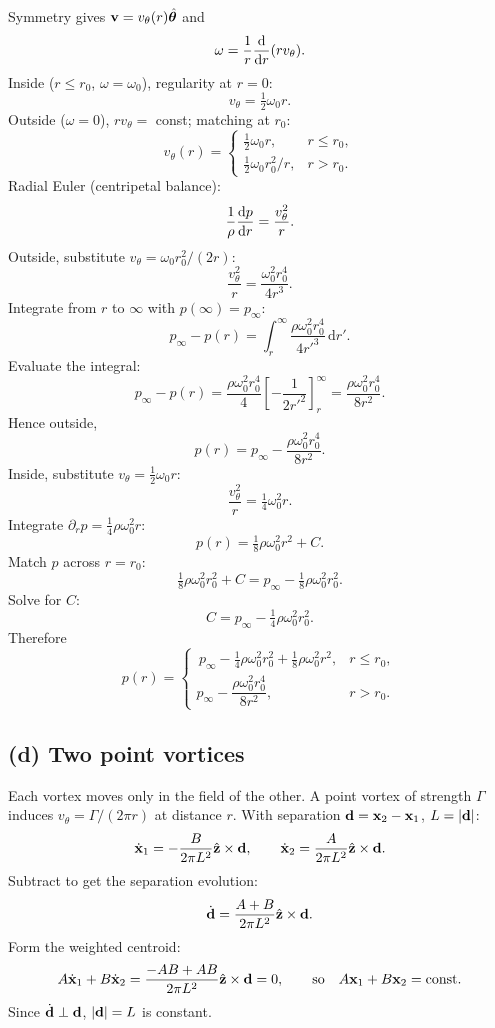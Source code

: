 \documentclass[11pt]{article}
\newcommand{\de}{\mathrm{d}}
\begin{document}
Symmetry gives $\vb v = v_\theta(r)\hat{\bm\theta}$ and
\[ \omega = \frac{1}{r}\dv{r}(rv_\theta). \]
Inside ($r\le r_0$, $\omega=\omega_0$), regularity at $r=0$:
\[ v_\theta = \tfrac12\omega_0 r. \]
Outside ($\omega=0$), $rv_\theta=$ const; matching at $r_0$:
\begin{equation}
\boxed{\;v_\theta(r) = \begin{cases}\tfrac12\omega_0 r, & r\le r_0,\\[2pt] \tfrac12\omega_0 r_0^2/r, & r>r_0.\end{cases}\;}
\label{eq:v-rankine}
\end{equation}
Radial Euler (centripetal balance):
\[ \frac{1}{\rho}\dv{p}{r} = \frac{v_\theta^2}{r}. \]
Outside, substitute $v_\theta = \omega_0 r_0^2/(2r)$:
\[ \frac{v_\theta^2}{r} = \frac{\omega_0^2 r_0^4}{4 r^3}. \]
Integrate from $r$ to $\infty$ with $p(\infty)=p_\infty$:
\[ p_\infty - p(r) = \int_r^\infty \frac{\rho\omega_0^2 r_0^4}{4 r'^3}\,\de r'. \]
Evaluate the integral:
\[ p_\infty - p(r) = \frac{\rho\omega_0^2 r_0^4}{4}\!\left[-\frac{1}{2r'^2}\right]_r^\infty = \frac{\rho\omega_0^2 r_0^4}{8 r^2}. \]
Hence outside,
\[ p(r) = p_\infty - \frac{\rho\omega_0^2 r_0^4}{8 r^2}. \]
Inside, substitute $v_\theta = \tfrac12\omega_0 r$:
\[ \frac{v_\theta^2}{r} = \tfrac14\omega_0^2 r. \]
Integrate $\partial_r p = \tfrac14\rho\omega_0^2 r$:
\[ p(r) = \tfrac18\rho\omega_0^2 r^2 + C. \]
Match $p$ across $r=r_0$:
\[ \tfrac18\rho\omega_0^2 r_0^2 + C = p_\infty - \tfrac18\rho\omega_0^2 r_0^2. \]
Solve for $C$:
\[ C = p_\infty - \tfrac14\rho\omega_0^2 r_0^2. \]
Therefore
\begin{equation}
\boxed{\;p(r) = \begin{cases}\,p_\infty - \tfrac14\rho\omega_0^2 r_0^2 + \tfrac18\rho\omega_0^2 r^2, & r\le r_0,\\[3pt] p_\infty - \dfrac{\rho\omega_0^2 r_0^4}{8 r^2}, & r>r_0.\end{cases}\;}
\end{equation}

\subsection*{(d) Two point vortices}

Each vortex moves only in the field of the other. A point vortex of strength $\Gamma$ induces $v_\theta = \Gamma/(2\pi r)$ at distance $r$. With separation $\vb d=\vb x_2-\vb x_1$, $L=|\vb d|$:
\begin{equation}
\dot{\vb x}_1 = -\frac{B}{2\pi L^2}\hat{\vb z}\times\vb d,\qquad \dot{\vb x}_2 = \frac{A}{2\pi L^2}\hat{\vb z}\times\vb d.
\end{equation}
Subtract to get the separation evolution:
\begin{equation}
\dot{\vb d} = \frac{A+B}{2\pi L^2}\hat{\vb z}\times\vb d.
\label{eq:d-evolve}
\end{equation}
Form the weighted centroid:
\begin{equation}
A\dot{\vb x}_1 + B\dot{\vb x}_2 = \frac{-AB+AB}{2\pi L^2}\hat{\vb z}\times\vb d = 0,\qquad\text{so}\quad A\vb x_1 + B\vb x_2 = \text{const}.
\label{eq:com-conserved}
\end{equation}
Since $\dot{\vb d}\perp\vb d$, $|\vb d|=L$ is constant.
\end{document}
